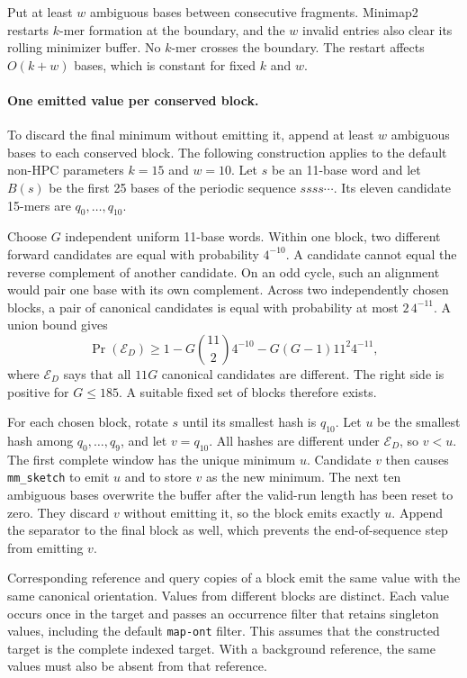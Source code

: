 Put at least \(w\) ambiguous bases between consecutive fragments. Minimap2 restarts
\(k\)-mer formation at the boundary, and the \(w\) invalid entries also clear
its rolling minimizer buffer. No \(k\)-mer crosses the boundary. The restart
affects \(O(k+w)\) bases, which is constant for fixed \(k\) and \(w\).

\paragraph{One emitted value per conserved block.}
To discard the final minimum without emitting it, append at least \(w\) ambiguous bases
to each conserved block. The following construction applies to the default
non-HPC parameters \(k=15\) and \(w=10\). Let \(s\) be an 11-base word and let
\(B(s)\) be the first 25 bases of the periodic sequence \(ssss\cdots\). Its
eleven candidate 15-mers are \(q_0,\ldots,q_{10}\).

Choose \(G\) independent uniform 11-base words. Within one block, two
different forward candidates are equal with probability \(4^{-10}\). A
candidate cannot equal the reverse complement of another candidate. On an
odd cycle, such an alignment would pair one base with its own complement.
Across two independently chosen blocks, a pair of canonical candidates is
equal with probability at most \(2\,4^{-11}\). A union bound gives
\begin{equation}
  \Pr(\mathcal E_D)\geq
  1-G\binom{11}{2}4^{-10}
  -G(G-1)11^2 4^{-11},
  \label{eq:chaining-conserved-block-existence}
\end{equation}
where \(\mathcal E_D\) says that all \(11G\) canonical candidates are
different. The right side is positive for \(G\leq185\). A suitable fixed set
of blocks therefore exists.

For each chosen block, rotate \(s\) until its smallest hash is \(q_{10}\).
Let \(u\) be the smallest hash among \(q_0,\ldots,q_9\), and let
\(v=q_{10}\). All hashes are different under \(\mathcal E_D\), so \(v<u\).
The first complete window has the unique minimum \(u\). Candidate \(v\) then
causes \texttt{mm\_sketch} to emit \(u\) and to store \(v\) as the new
minimum. The next ten ambiguous bases overwrite the buffer after
the valid-run length has been reset to zero. They discard \(v\) without
emitting it, so the block emits
exactly \(u\). Append the separator to the final block as well, which prevents
the end-of-sequence step from emitting \(v\).

Corresponding reference and query copies of a block emit the same value with
the same canonical orientation. Values from different blocks are distinct.
Each value occurs once in the target and passes an occurrence filter that
retains singleton values, including the default \texttt{map-ont} filter. This
assumes that the constructed target is the complete indexed target. With a
background reference, the same values must also be absent from that reference.


